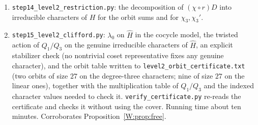 \begin{enumerate}[label=\arabic*.]
$H=Q_3/Q_7$ (multiplication table, $297$ classes), its character table
by Burnside's algorithm with exact re-verification, the $\Ad(Q_1)$-orbits
on $\Irr(H)$, the $219$ good classes and the cube root; the criterion
of Proposition~\ref{W:prop:criterion} tested by exact integer linear
algebra (Smith normal form) for the four $D_8$-orbit sums of
$\Irr(\mathrm{Heis})$.
\item \texttt{step14\_level2\_restriction.py}: the decomposition of
$(\chi\circ r)D$ into irreducible characters of $H$ for the orbit sums
and for $\chi_3,\chi_3'$.
\item \texttt{step15\_level2\_clifford.py}: $\lambda_0$ on $\hat H$ in
the cocycle model, the twisted action of $Q_1/Q_3$ on the genuine
irreducible characters of $\hat H$, an explicit stabilizer check (no
nontrivial coset representative fixes any genuine character), and the
orbit table written to \texttt{level2\_orbit\_certificate.txt} (two
orbits of size $27$ on the degree-three characters; nine of size $27$
on the linear ones), together with the multiplication table of
$Q_1/Q_3$ and the indexed character values needed to check it.
\texttt{verify\_certificate.py} re-reads the certificate and checks it
without using the cover.  Running time about ten minutes.  Corroborates
Proposition~\ref{W:prop:free}.
\end{enumerate}
\endgroup
